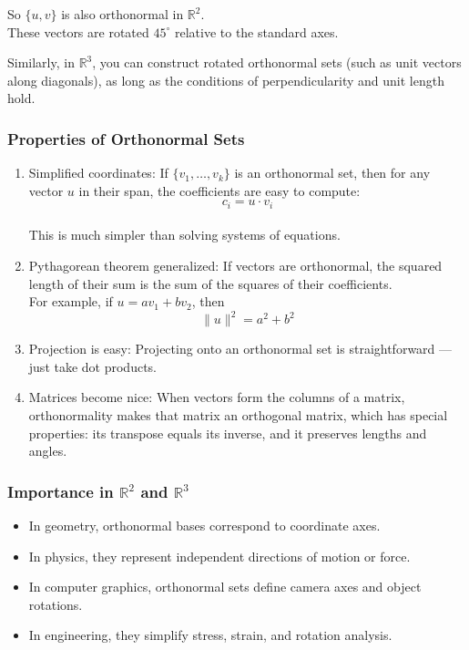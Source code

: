 \documentclass[
  letterpaper,
  DIV=11,
  numbers=noendperiod]{scrreprt}
\providecommand{\tightlist}{%
  \setlength{\itemsep}{0pt}\setlength{\parskip}{0pt}}
\begin{document}
So \(\{u, v\}\) is also orthonormal in \(\mathbb{R}^2\).\\
These vectors are rotated \(45^\circ\) relative to the standard axes.

Similarly, in \(\mathbb{R}^3\), you can construct rotated orthonormal
sets (such as unit vectors along diagonals), as long as the conditions
of perpendicularity and unit length hold.

\subsubsection{Properties of Orthonormal
Sets}\label{properties-of-orthonormal-sets}

\begin{enumerate}
\def\labelenumi{\arabic{enumi}.}
\item
  Simplified coordinates: If \(\{v_1, \ldots, v_k\}\) is an orthonormal
  set, then for any vector \(u\) in their span, the coefficients are
  easy to compute:\\
  \[
  c_i = u \cdot v_i
  \]\\
  This is much simpler than solving systems of equations.
\item
  Pythagorean theorem generalized: If vectors are orthonormal, the
  squared length of their sum is the sum of the squares of their
  coefficients.\\
  For example, if \(u = a v_1 + b v_2\), then\\
  \[
  \|u\|^2 = a^2 + b^2
  \]
\item
  Projection is easy: Projecting onto an orthonormal set is
  straightforward --- just take dot products.
\item
  Matrices become nice: When vectors form the columns of a matrix,
  orthonormality makes that matrix an orthogonal matrix, which has
  special properties: its transpose equals its inverse, and it preserves
  lengths and angles.
\end{enumerate}

\subsubsection{\texorpdfstring{Importance in \(\mathbb{R}^2\) and
\(\mathbb{R}^3\)}{Importance in \textbackslash mathbb\{R\}\^{}2 and \textbackslash mathbb\{R\}\^{}3}}\label{importance-in-mathbbr2-and-mathbbr3}

\begin{itemize}
\tightlist
\item
  In geometry, orthonormal bases correspond to coordinate axes.
\item
  In physics, they represent independent directions of motion or force.
\item
  In computer graphics, orthonormal sets define camera axes and object
  rotations.
\item
  In engineering, they simplify stress, strain, and rotation analysis.
\end{itemize}
\end{document}
